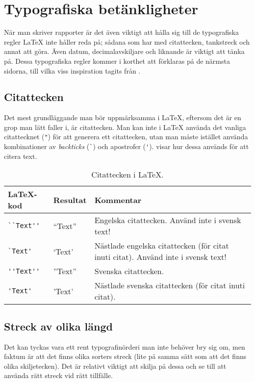 \documentclass[10pt,../../a4.tex]{subfiles}
\begin{document}
\section{Typografiska betänkligheter}
När man skriver rapporter är det även viktigt att hålla sig till de
typografiska regler \LaTeX{} inte håller reda på; sådana som har med
citattecken, tankstreck och annat att göra. Även datum, decimalavskiljare
och liknande är viktigt att tänka på. Dessa typografiska regler kommer i
korthet att förklaras på de närmsta sidorna, till vilka viss inspiration 
tagits från \textcite{Schultz05}.

\subsection{Citattecken}
Det mest grundläggande man bör uppmärksamma i \LaTeX{}, eftersom det är en
grop man lätt faller i, är citattecken. Man kan inte i \LaTeX{} använda
det vanliga citattecknet (\verb|"|) för att generera ett citattecken, utan
man måste istället använda kombinationer av \emph{backticks} (\verb|`|)
och apostrofer (\verb|'|).  visar hur dessa används
för att citera text.

\begin{table}[tbp]
	\centering 
	\caption{Citattecken i \LaTeX.}
	\label{tab:citat}
	\begin{tabular}{l l p{}}
		\toprule 
		\LaTeX-kod & Resultat & Kommentar \\ 
		\midrule 
		\verb|``Text''| & “Text” & Engelska citattecken. Använd inte i
		svensk text! \\
		\verb|`Text'| & ‘Text’ & Nästlade engelska citattecken (för citat
		inuti citat). Använd inte i svensk text! \\ 
		\verb|''Text''| & ”Text” & Svenska citattecken. \\
		\verb|'Text'| & ’Text’ & Nästlade svenska citattecken (för citat
		inuti citat). \\
		\bottomrule 
	\end{tabular}
\end{table}

\subsection{Streck av olika längd}
Det kan tyckas vara ett rent typografinörderi man inte behöver bry sig om,
men faktum är att det finns olika sorters streck (lite på samma sätt som
att det finns olika skiljetecken). Det är relativt viktigt att skilja på
dessa och se till att använda rätt streck vid rätt tillfälle.
\end{document}
